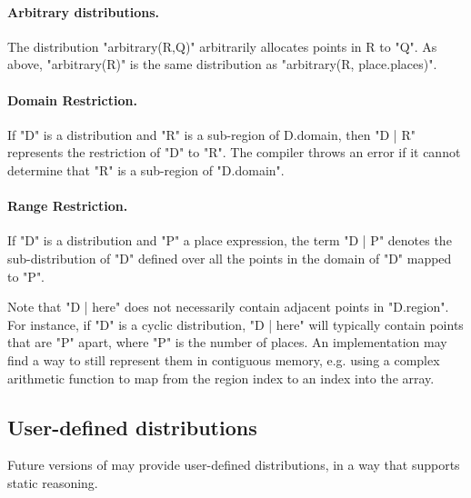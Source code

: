 \paragraph{Arbitrary distributions.} 
The distribution \xcd"arbitrary(R,Q)" arbitrarily allocates points in {\cf
R} to \xcd"Q". As above, \xcd"arbitrary(R)" is the same distribution as
\xcd"arbitrary(R, place.places)".


\paragraph{Domain Restriction.} 

If \xcd"D" is a distribution and \xcd"R" is a sub-region of {\cf
D.domain}, then \xcd"D | R" represents the restriction of \xcd"D" to
\xcd"R".  The compiler throws an error if it cannot determine that
\xcd"R" is a sub-region of \xcd"D.domain".

\paragraph{Range Restriction.}

If \xcd"D" is a distribution and \xcd"P" a place expression, the term
\xcd"D | P" denotes the sub-distribution of \xcd"D" defined over all the
points in the domain of \xcd"D" mapped to \xcd"P".

\cbstart
Note that \xcd"D | here" does not necessarily contain adjacent points
in \xcd"D.region". For instance, if \xcd"D" is a cyclic distribution,
\xcd"D | here" will typically contain points that are \xcd"P" apart,
where \xcd"P" is the number of places. An implementation may find a
way to still represent them in contiguous memory, e.g.{} using a
complex arithmetic function to map from the region index to an index
into the array.
\cbend

\subsection{User-defined distributions}

Future versions of \Xten{} may provide user-defined distributions, in
a way that supports static reasoning.


